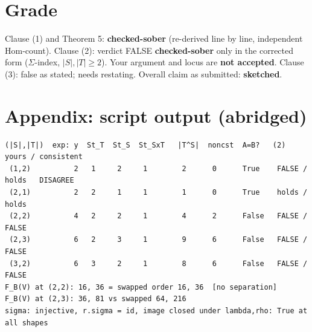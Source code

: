 \documentclass[11pt]{article}
\begin{document}
\section*{Grade}
Clause (1) and Theorem 5: \textbf{checked-sober} (re-derived line by line, independent Hom-count).
Clause (2): verdict FALSE \textbf{checked-sober} only in the corrected form ($\Sigma$-index, $|S|,|T|\ge2$).
Your argument and locus are \textbf{not accepted}. Clause (3): false as stated; needs restating.
Overall claim as submitted: \textbf{sketched}.

\section*{Appendix: script output (abridged)}
{\small\begin{verbatim}
(|S|,|T|)  exp: y  St_T  St_S  St_SxT   |T^S|  noncst  A=B?   (2) yours / consistent
 (1,2)          2   1     2     1        2      0      True    FALSE / holds   DISAGREE
 (2,1)          2   2     1     1        1      0      True    holds / holds
 (2,2)          4   2     2     1        4      2      False   FALSE / FALSE
 (2,3)          6   2     3     1        9      6      False   FALSE / FALSE
 (3,2)          6   3     2     1        8      6      False   FALSE / FALSE
F_B(V) at (2,2): 16, 36 = swapped order 16, 36  [no separation]
F_B(V) at (2,3): 36, 81 vs swapped 64, 216
sigma: injective, r.sigma = id, image closed under lambda,rho: True at all shapes
\end{verbatim}}
\end{document}
